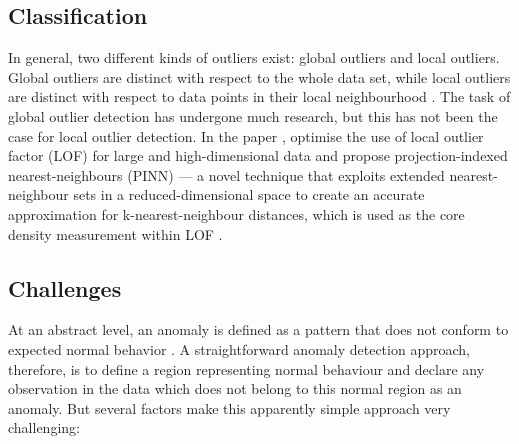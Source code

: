 \subsection{Classification}
\label{sec:anomalyClassification}
In general, two different kinds of outliers exist: global outliers and local 
outliers. Global outliers are distinct with respect to the whole data set, while
local outliers are distinct with respect to data points in their local 
neighbourhood \cite{Vries:2011}. The task of global outlier detection has 
undergone much research, but this has not been the case for local outlier 
detection. In the paper , \citeauthor{Vries:2011} optimise
the use of local outlier factor (LOF) for large and high-dimensional data and
propose projection-indexed nearest-neighbours (PINN) --- a novel technique that 
exploits extended nearest-neighbour sets in a reduced-dimensional space to 
create an accurate approximation for k-nearest-neighbour distances, which is 
used as the core density measurement within LOF \cite{Vries:2011}.

\subsection{Challenges}
\label{sec:anomalyDetectionChallenges}
At an abstract level, an anomaly is defined as a pattern that does not conform 
to expected normal behavior \cite{Chandola:2007}. A straightforward anomaly 
detection approach, therefore, is to define a region representing normal 
behaviour and declare any observation in the data which does not belong to this 
normal region as an anomaly. But several factors make this apparently simple 
approach very challenging:

